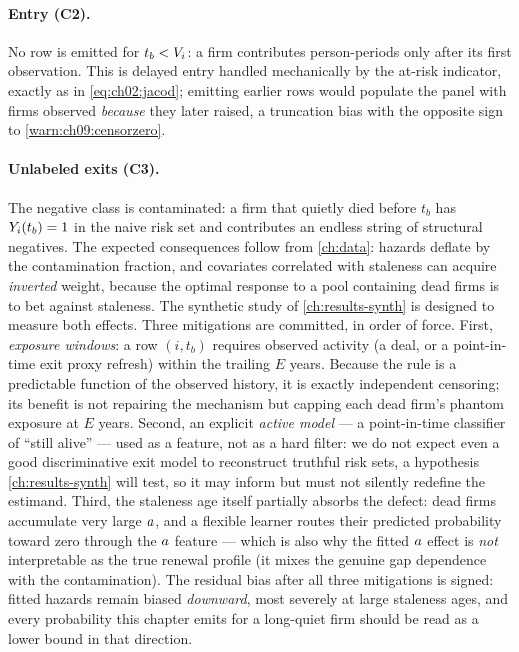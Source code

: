 \paragraph{Entry (C2).} No row is emitted for $t_b < V_i$: a firm
contributes person-periods only after its first observation. This is
delayed entry handled mechanically by the at-risk indicator, exactly as
in \cref{eq:ch02:jacod}; emitting earlier rows would populate the panel
with firms observed \emph{because} they later raised, a truncation bias
with the opposite sign to \cref{warn:ch09:censorzero}.

\paragraph{Unlabeled exits (C3).} The negative class is contaminated:
a firm that quietly died before $t_b$ has $Y_i(t_b) = 1$ in the
naive risk set and contributes an endless string of structural
negatives. The expected consequences follow from \cref{ch:data}:
hazards deflate by the contamination fraction, and covariates
correlated with staleness can acquire \emph{inverted} weight, because
the optimal response to a pool containing dead firms is to bet against
staleness. The synthetic study of \cref{ch:results-synth} is designed
to measure both effects. Three mitigations are committed, in order of
force. First, \emph{exposure windows}: a row $(i,t_b)$ requires
observed activity (a deal, or a point-in-time exit proxy refresh)
within the trailing $E$ years. Because the rule is a predictable
function of the observed history, it is exactly independent censoring;
its benefit is not repairing the mechanism but capping each dead firm's
phantom exposure at $E$ years. Second, an explicit \emph{active model}
--- a point-in-time classifier of ``still alive'' --- used as a
feature, not as a hard filter: we do not expect even a good
discriminative exit model to reconstruct truthful risk sets, a
hypothesis \cref{ch:results-synth} will test, so it may inform but must
not silently redefine the estimand. Third, the staleness age itself
partially absorbs the defect: dead firms accumulate very large
$a$, and a flexible learner routes their predicted probability
toward zero through the $a$ feature --- which is also why the
fitted $a$ effect is \emph{not} interpretable as the true
renewal profile (it mixes the genuine gap dependence with the
contamination). The residual bias after all three mitigations is
signed: fitted hazards remain biased \emph{downward}, most severely at
large staleness ages, and every probability this chapter emits for a
long-quiet firm should be read as a lower bound in that direction.

